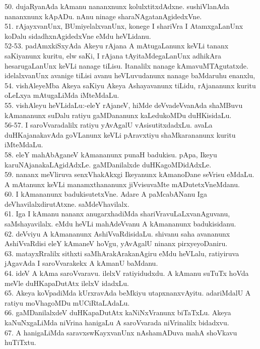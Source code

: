 \documentclass{article}
\begin{document}
50. dujaRyanAda kAmanu nananxnunx kolulxtitxdAdxne. sushiVlanAda nananxnunx kApADu. nAnu ninage sharaNAgatanAgidedxVne.\\
51. rAjayxvanUnx, BUmiyelalxvanUnx, konege I shariVra I AtamxgaLanUnx koDalu sidadhxnAgidedxVne eMdu heVLidanu.\\
52-53. padAmxkiSxyAda Akeyu rAjana A mAtugaLanunx keVLi tananx saKiyanunx kuritu, elw saKi, I rAjana tAyitaMdegaLanUnx adhikAra hesarugaLanUnx keVLi nanage tiLisu. Itanalilx nanage kAmavuMTAgutatxde. idelalxvanUnx avanige tiLisi avanu heVLuvudanunx nanage baMdaruhu enanxlu,\\
54. vishAleyeMba Akeya saKiyu Akeya Ashayavanunx tiLidu, rAjananunx kuritu oLeLxya mAtugaLiMda iMteMdaLu.\\
55. vishAleyu heVLidaLu:-eleY rAjaneV, hiMde deVvadeVvanAda shaMBuvu kAmananunx suDalu ratiyu gaMDananunx kaLedukoMDu duHKisidaLu.\\
56-57. I saroVvaradalilx ratiyu yAvAgalU vAsisutitxdadxLu. avaLa duHKajanakavAda goVLanunx keVLi pAravxtiyu shaMkarananunx kuritu iMteMdaLu.\\
58. eleY mahAbAganeV kAmananunx punaH badukisu. pApa, Ikeyu karuNAjanakaLAgidAdxLe. gaMDanilalxde duHKagoMDidAdxLe.\\
59. nananx meVliruva senxVhakAkxgi Ikeyanunx kAmanoDane seVrisu eMdaLu. A mAtanunx keVLi manamxthananunx jiVvisuvaMte mADutetxVneMdanu.\\
60. I kAmananunx badukisutetxVne. Adare A paMcabANanu Iga deVhavilalxdirutAtxne. saMdeVhavilalx.\\
61. Iga I kAmanu nananx anugarxhadiMda shariVravuLaLxvanAguvanu, saMshayavilalx. eMdu heVLi mahAdeVvanu A kAmananunx badukisidanu.\\
62. deVviyu A kAmananunx AshiVvaRdisidaLu. shivanu saha avananunx AshiVvaRdisi eleY kAmaneV hoVgu, yAvAgalU ninanx pirxyeyoDaniru.\\
63. matayxRralilx sithxti saMhArakArakanAgiru eMdu heVLalu, ratiyiruva jAgavAda I saroVvarakekx A kAmanU baMdanu.\\
64. ideV A kAma saroVvaravu. ilelxV ratiyidudxdu. A kAmanu suTuTx hoVda meVle duHKapaDutAtx ilelxV idadxLu.\\
65. Akeya koVpadiMda kUrxravAda beMkiyu utapxnanxvAyitu. adariMdalU A ratiyu moVhagoMDu mUCiRtaLAdaLu.\\
66. gaMDanilalxdeV duHKapaDutAtx kaNiNxVranunx biTaTxLu. Akeya kaNuNxgaLiMda niVrina hanigaLu A saroVvarada niVrinalilx bidadxvu.\\
67. A hanigaLiMda saravxswKayxvanUnx nAshamADuva mahA shoVkavu huTiTxtu.\\
\end{document}

